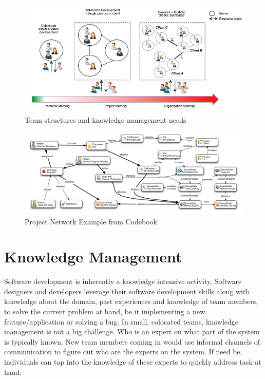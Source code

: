 
\begin{figure}
	\center
	\includegraphics[scale=0.7]{figs/km-types.png}
	\caption{Team structures and knowledge management needs}
	\label{fig-km}
\end{figure}

\begin{figure}
	\center
	\includegraphics[scale=0.4]{figs/codebook.png}
	\caption{Project Network Example from Codebook}
	\label{fig-codebook}
\end{figure}

\section{Knowledge Management}
\label{sec:km}

Software development is inherently a knowledge intensive activity. Software designers and developers leverage their software development skills along with knowledge about the domain, past experiences and knowledge of team members, to solve the current problem at hand, be it implementing a new feature/application or solving a bug. 
In small, colocated teams, knowledge management is not a big challenge. Who is an expert on what part of the system is typically known. New team members coming in would use informal channels of communication to figure out who are the experts on the system. If need be, individuals can tap into the knowledge of these experts to quickly address task at hand. 

